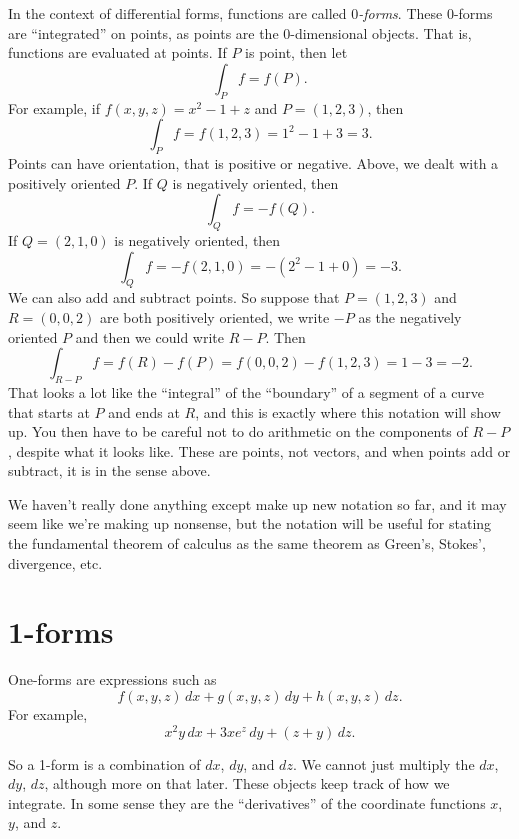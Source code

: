 \documentclass[12pt]{article}
\begin{document}
In the context of differential forms,
functions are called \emph{$0$-forms}.  These $0$-forms are ``integrated''
on points, as points are the $0$-dimensional objects.
That is, functions are evaluated at points.  If $P$ is point, then let
\[
\int_P f = f(P) .
\]
For example,
if $f(x,y,z) = x^2-1+z$ and $P=(1,2,3)$, then
\[
\int_P f = f(1,2,3) = 1^2-1+3 =3 .
\]
Points can have orientation, that is positive or negative.  Above, we dealt
with a positively oriented $P$.  If $Q$ is negatively oriented, then 
\[
\int_Q f = -f(Q).
\]
If $Q = (2,1,0)$ is negatively oriented, then
\[
\int_Q f = -f(2,1,0) = -( 2^2-1+0 ) = -3.
\]
We can also add and subtract points.  So suppose that $P=(1,2,3)$ and
$R = (0,0,2)$ are both positively oriented, we write $-P$ as the negatively
oriented $P$ and then we could write $R-P$.  Then
\[
\int_{R-P} f = f(R)-f(P) = f(0,0,2)-f(1,2,3) = 1-3 = -2.
\]
That looks a lot like the ``integral'' of the ``boundary'' of a segment of
a curve that starts at $P$ and ends at $R$, and this is exactly where this
notation will show up.
You then have to be careful
not to do arithmetic on the components of $R-P$, despite what it looks like.
These are points, not vectors, and when points add or subtract, it is in the
sense above.

We haven't really done anything except make up new notation so far, and
it may seem like we're making up nonsense, but the notation will be useful for
stating the fundamental theorem of calculus as the same theorem as 
Green's, Stokes', divergence, etc.

\section*{1-forms}

One-forms are expressions such as
\[
f(x,y,z) \, dx + 
g(x,y,z) \, dy + 
h(x,y,z) \, dz .
\]
For example,
\[
x^2y \, dx + 
3xe^z \, dy + 
(z+y) \, dz .
\]

So a 1-form is a combination of $dx$, $dy$, and $dz$.  We cannot just
multiply the $dx$, $dy$, $dz$, although more on that later.  These objects
keep track of how we integrate.  In some sense they are the ``derivatives''
of the coordinate functions $x$, $y$, and $z$.
\end{document}
